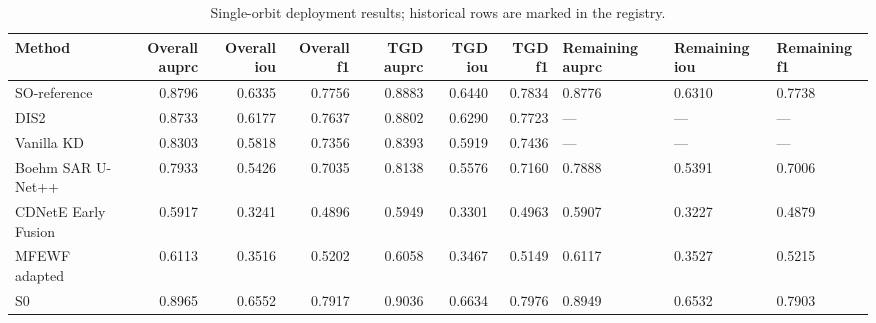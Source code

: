 \begin{table}[t]
\centering
\begin{tabular}{lrrrrrrlll}
\toprule
Method & Overall auprc & Overall iou & Overall f1 & TGD auprc & TGD iou & TGD f1 & Remaining auprc & Remaining iou & Remaining f1 \\
\midrule
SO-reference & 0.8796 & 0.6335 & 0.7756 & 0.8883 & 0.6440 & 0.7834 & 0.8776 & 0.6310 & 0.7738 \\
DIS2 & 0.8733 & 0.6177 & 0.7637 & 0.8802 & 0.6290 & 0.7723 & — & — & — \\
Vanilla KD & 0.8303 & 0.5818 & 0.7356 & 0.8393 & 0.5919 & 0.7436 & — & — & — \\
Boehm SAR U-Net++ & 0.7933 & 0.5426 & 0.7035 & 0.8138 & 0.5576 & 0.7160 & 0.7888 & 0.5391 & 0.7006 \\
CDNetE Early Fusion & 0.5917 & 0.3241 & 0.4896 & 0.5949 & 0.3301 & 0.4963 & 0.5907 & 0.3227 & 0.4879 \\
MFEWF adapted & 0.6113 & 0.3516 & 0.5202 & 0.6058 & 0.3467 & 0.5149 & 0.6117 & 0.3527 & 0.5215 \\
S0 & 0.8965 & 0.6552 & 0.7917 & 0.9036 & 0.6634 & 0.7976 & 0.8949 & 0.6532 & 0.7903 \\
\bottomrule
\end{tabular}
\caption{Single-orbit deployment results; historical rows are marked in the registry.}\label{tab:deployment}
\end{table}
